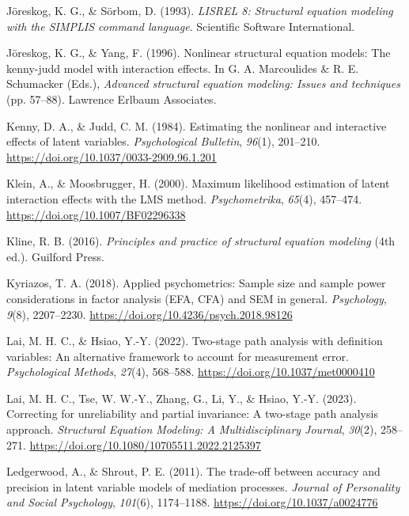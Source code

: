 \documentclass[
  man]{apa6}
\newlength{\cslhangindent}
\newenvironment{CSLReferences}[2] %
 {\begin{list}{}{%
  \setlength{\itemindent}{0pt}
  \setlength{\leftmargin}{0pt}
  \setlength{\parsep}{0pt}
  \ifodd #1
   \setlength{\leftmargin}{\cslhangindent}
   \setlength{\itemindent}{-1\cslhangindent}
  \fi
  \setlength{\itemsep}{#2\baselineskip}}}
 {\end{list}}
\begin{document}
\begin{CSLReferences}{1}{0}
Jöreskog, K. G., \& Sörbom, D. (1993). \emph{LISREL 8: Structural equation modeling with the SIMPLIS command language}. Scientific Software International.

Jöreskog, K. G., \& Yang, F. (1996). Nonlinear structural equation models: The kenny-judd model with interaction effects. In G. A. Marcoulides \& R. E. Schumacker (Eds.), \emph{Advanced structural equation modeling: Issues and techniques} (pp. 57--88). Lawrence Erlbaum Associates.

Kenny, D. A., \& Judd, C. M. (1984). Estimating the nonlinear and interactive effects of latent variables. \emph{Psychological Bulletin}, \emph{96}(1), 201--210. \url{https://doi.org/10.1037/0033-2909.96.1.201}

Klein, A., \& Moosbrugger, H. (2000). Maximum likelihood estimation of latent interaction effects with the {LMS} method. \emph{Psychometrika}, \emph{65}(4), 457--474. \url{https://doi.org/10.1007/BF02296338}

Kline, R. B. (2016). \emph{Principles and practice of structural equation modeling} (4th ed.). Guilford Press.

Kyriazos, T. A. (2018). Applied psychometrics: Sample size and sample power considerations in factor analysis (EFA, CFA) and SEM in general. \emph{Psychology}, \emph{9}(8), 2207--2230. \url{https://doi.org/10.4236/psych.2018.98126}

Lai, M. H. C., \& Hsiao, Y.-Y. (2022). Two-stage path analysis with definition variables: {An} alternative framework to account for measurement error. \emph{Psychological Methods}, \emph{27}(4), 568--588. \url{https://doi.org/10.1037/met0000410}

Lai, M. H. C., Tse, W. W.-Y., Zhang, G., Li, Y., \& Hsiao, Y.-Y. (2023). Correcting for unreliability and partial invariance: {A} two-stage path analysis approach. \emph{Structural Equation Modeling: A Multidisciplinary Journal}, \emph{30}(2), 258--271. \url{https://doi.org/10.1080/10705511.2022.2125397}

Ledgerwood, A., \& Shrout, P. E. (2011). The trade-off between accuracy and precision in latent variable models of mediation processes. \emph{Journal of Personality and Social Psychology}, \emph{101}(6), 1174--1188. \url{https://doi.org/10.1037/a0024776}


\end{CSLReferences}
\end{document}
